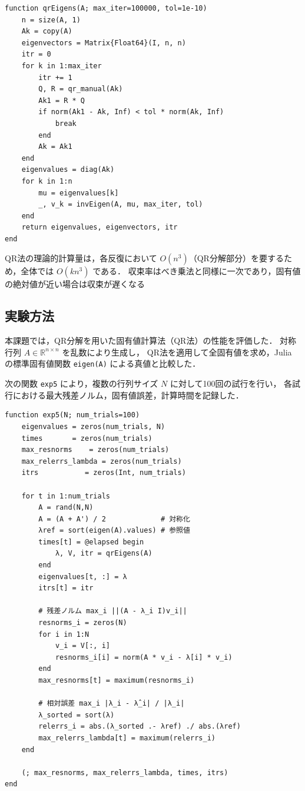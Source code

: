 \documentclass[a4paper,11pt]{ltjsarticle}
\begin{document}
\begin{verbatim}
function qrEigens(A; max_iter=100000, tol=1e-10)
    n = size(A, 1)
    Ak = copy(A)
    eigenvectors = Matrix{Float64}(I, n, n)
    itr = 0
    for k in 1:max_iter
        itr += 1
        Q, R = qr_manual(Ak)
        Ak1 = R * Q
        if norm(Ak1 - Ak, Inf) < tol * norm(Ak, Inf)
            break
        end
        Ak = Ak1
    end
    eigenvalues = diag(Ak)
    for k in 1:n
        mu = eigenvalues[k]
        _, v_k = invEigen(A, mu, max_iter, tol)
    end
    return eigenvalues, eigenvectors, itr
end
\end{verbatim}

QR法の理論的計算量は，各反復において $O(n^3)$（QR分解部分）を要するため，全体では $O(k n^3)$ である．
収束率はべき乗法と同様に一次であり，固有値の絶対値が近い場合は収束が遅くなる

\subsection{実験方法}

本課題では，QR分解を用いた固有値計算法（QR法）の性能を評価した．
対称行列 $A \in \mathbb{R}^{n \times n}$ を乱数により生成し，
QR法を適用して全固有値を求め，Julia の標準固有値関数 \texttt{eigen(A)} による真値と比較した．

次の関数 \verb|exp5| により，複数の行列サイズ $N$ に対して100回の試行を行い，
各試行における最大残差ノルム，固有値誤差，計算時間を記録した．

\begin{verbatim}
function exp5(N; num_trials=100)
    eigenvalues = zeros(num_trials, N)
    times       = zeros(num_trials)
    max_resnorms    = zeros(num_trials)
    max_relerrs_lambda = zeros(num_trials)
    itrs           = zeros(Int, num_trials)

    for t in 1:num_trials
        A = rand(N,N)
        A = (A + A') / 2             # 対称化
        λref = sort(eigen(A).values) # 参照値
        times[t] = @elapsed begin
            λ, V, itr = qrEigens(A)
        end
        eigenvalues[t, :] = λ
        itrs[t] = itr
        
        # 残差ノルム max_i ||(A - λ_i I)v_i||
        resnorms_i = zeros(N)
        for i in 1:N
            v_i = V[:, i]
            resnorms_i[i] = norm(A * v_i - λ[i] * v_i)
        end
        max_resnorms[t] = maximum(resnorms_i)
        
        # 相対誤差 max_i |λ_i - λ̂_i| / |λ_i|
        λ_sorted = sort(λ)
        relerrs_i = abs.(λ_sorted .- λref) ./ abs.(λref)
        max_relerrs_lambda[t] = maximum(relerrs_i)
    end

    (; max_resnorms, max_relerrs_lambda, times, itrs)
end
\end{verbatim}
\end{document}
